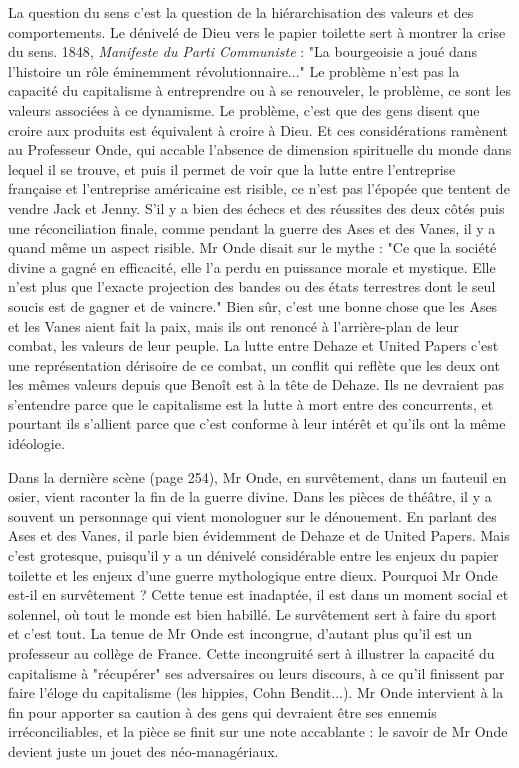 \documentclass[a4paper,12pt]{book}
\begin{document}
\par La question du sens c'est la question de la hiérarchisation des valeurs et des comportements. Le dénivelé de Dieu vers le papier toilette sert à montrer la crise du sens. 1848, \textit{Manifeste du Parti Communiste} : "La bourgeoisie a joué dans l'histoire un rôle éminemment révolutionnaire..." Le problème n'est pas la capacité du capitalisme à entreprendre ou à se renouveler, le problème, ce sont les valeurs associées à ce dynamisme. Le problème, c'est que des gens disent que croire aux produits est équivalent à croire à Dieu. Et ces considérations ramènent au Professeur Onde, qui accable l'absence de dimension spirituelle du monde dans lequel il se trouve, et puis il permet de voir que la lutte entre l'entreprise française et l'entreprise américaine est risible, ce n'est pas l'épopée que tentent de vendre Jack et Jenny. S'il y a bien des échecs et des réussites des deux côtés puis une réconciliation finale, comme pendant la guerre des Ases et des Vanes, il y a quand même un aspect risible. Mr Onde disait sur le mythe : "Ce que la société divine a gagné en efficacité, elle l'a perdu en puissance morale et mystique. Elle n'est plus que l'exacte projection des bandes ou des états terrestres dont le seul soucis est de gagner et de vaincre." Bien sûr, c'est une bonne chose que les Ases et les Vanes aient fait la paix, mais ils ont renoncé à l'arrière-plan de leur combat, les valeurs de leur peuple. La lutte entre Dehaze et United Papers c'est une représentation dérisoire de ce combat, un conflit qui reflète que les deux ont les mêmes valeurs depuis que Benoît est à la tête de Dehaze. Ils ne devraient pas s'entendre parce que le capitalisme est la lutte à mort entre des concurrents, et pourtant ils s'allient parce que c'est conforme à leur intérêt et qu'ils ont la même idéologie.
\par Dans la dernière scène (page 254), Mr Onde, en survêtement, dans un fauteuil en osier, vient raconter la fin de la guerre divine. Dans les pièces de théâtre, il y a souvent un personnage qui vient monologuer sur le dénouement. En parlant des Ases et des Vanes, il parle bien évidemment de Dehaze et de United Papers. Mais c'est grotesque, puisqu'il y a un dénivelé considérable entre les enjeux du papier toilette et les enjeux d'une guerre mythologique entre dieux. Pourquoi Mr Onde est-il en survêtement ? Cette tenue est inadaptée, il est dans un moment social et solennel, où tout le monde est bien habillé. Le survêtement sert à faire du sport et c'est tout. La tenue de Mr Onde est incongrue, d'autant plus qu'il est un professeur au collège de France. Cette incongruité sert à illustrer la capacité du capitalisme à "récupérer" ses adversaires ou leurs discours, à ce qu'il finissent par faire l'éloge du capitalisme (les hippies, Cohn Bendit...). Mr Onde intervient à la fin pour apporter sa caution à des gens qui devraient être ses ennemis irréconciliables, et la pièce se finit sur une note accablante : le savoir de Mr Onde devient juste un jouet des néo-managériaux.
\end{document}
